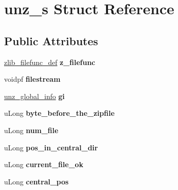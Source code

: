\hypertarget{structunz__s}{\section{unz\-\_\-s Struct Reference}
\label{structunz__s}
}
\subsection*{Public Attributes}
\begin{DoxyCompactItemize}
\item 
\hypertarget{structunz__s_a7be6cd9deaecd46f98f462bf6594baf1}{\hyperlink{structzlib__filefunc__def__s}{zlib\-\_\-filefunc\-\_\-def} {\bfseries z\-\_\-filefunc}}\label{structunz__s_a7be6cd9deaecd46f98f462bf6594baf1}

\item 
\hypertarget{structunz__s_a40596bc73de7dacd226048d4334b5c78}{voidpf {\bfseries filestream}}\label{structunz__s_a40596bc73de7dacd226048d4334b5c78}

\item 
\hypertarget{structunz__s_a131303f89af11a26b53e99a58d6517cf}{\hyperlink{structunz__global__info__s}{unz\-\_\-global\-\_\-info} {\bfseries gi}}\label{structunz__s_a131303f89af11a26b53e99a58d6517cf}

\item 
\hypertarget{structunz__s_a788688a8021cbbba6a2ac1765edd362e}{u\-Long {\bfseries byte\-\_\-before\-\_\-the\-\_\-zipfile}}\label{structunz__s_a788688a8021cbbba6a2ac1765edd362e}

\item 
\hypertarget{structunz__s_a737337b347bd5cc52bfabdcfbc11b853}{u\-Long {\bfseries num\-\_\-file}}\label{structunz__s_a737337b347bd5cc52bfabdcfbc11b853}

\item 
\hypertarget{structunz__s_a70f2901a7ba85573aa280bad826baf4a}{u\-Long {\bfseries pos\-\_\-in\-\_\-central\-\_\-dir}}\label{structunz__s_a70f2901a7ba85573aa280bad826baf4a}

\item 
\hypertarget{structunz__s_abe2244ba62db8b3251634e26183f1c9a}{u\-Long {\bfseries current\-\_\-file\-\_\-ok}}\label{structunz__s_abe2244ba62db8b3251634e26183f1c9a}

\item 
\hypertarget{structunz__s_a2d8ae4c0975d2057e30b13c3148c27eb}{u\-Long {\bfseries central\-\_\-pos}}\label{structunz__s_a2d8ae4c0975d2057e30b13c3148c27eb}


\end{DoxyCompactItemize}
